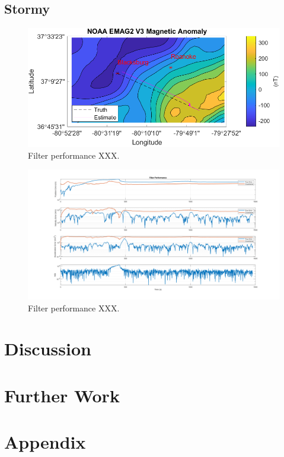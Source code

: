 \documentclass[conf]{new-aiaa}
\begin{document}
\subsection{Stormy} %

\begin{figure}[h!]
\centering
\includegraphics[width=.75\textwidth]{figures/trajectory.png}
\caption{Filter performance XXX.}
\end{figure}

\begin{figure}[h!]
\centering
\includegraphics[width=1.0\textwidth]{figures/filter_performance.png}
\caption{Filter performance XXX.}
\end{figure}

\section{Discussion} %

\section{Further Work} %

\section*{Appendix} %

\end{document}
